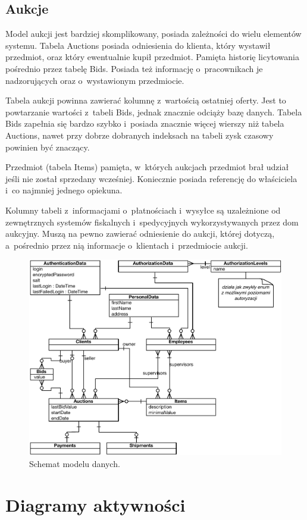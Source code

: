 \documentclass[10pt,a4paper]{article}
\newcommand{\s}[1]{\textsf{#1}}
\begin{document}
\subsection{Aukcje}

Model aukcji jest bardziej skomplikowany, posiada zależności do wielu elementów
systemu. Tabela \s{Auctions} posiada odniesienia do klienta, który wystawił
przedmiot, oraz który ewentualnie kupił przedmiot. Pamięta historię licytowania
pośrednio przez tabelę \s{Bids}. Posiada też informację o~pracownikach je
nadzorujących oraz o~wystawionym przedmiocie.

Tabela aukcji powinna zawierać kolumnę z~wartością ostatniej oferty. Jest to
powtarzanie wartości z~tabeli \s{Bids}, jednak znacznie odciąży bazę danych.
Tabela \s{Bids} zapełnia się bardzo szybko i~posiada znacznie więcej wierszy
niż tabela \s{Auctions}, nawet przy dobrze dobranych indeksach na tabeli zysk
czasowy powinien być znaczący.

Przedmiot (tabela \s{Items}) pamięta, w~których aukcjach przedmiot brał udział
jeśli nie został sprzedany wcześniej. Koniecznie posiada referencję do
właściciela i~co najmniej jednego opiekuna.

Kolumny tabeli z~informacjami o~płatnościach i~wysyłce są uzależnione od
zewnętrznych systemów fiskalnych i~spedycyjnych wykorzystywanych przez dom
aukcyjny. Muszą na pewno zawierać odniesienie do aukcji, której dotyczą,
a~pośrednio przez nią informacje o~klientach i~przedmiocie aukcji.

\begin{figure}[p]
  \begin{adjustwidth}{-2cm}{-2cm}
    \centering
    \includegraphics{figury/model-danych}
    \caption{Schemat modelu danych.}
    \label{fig:model_danych}
  \end{adjustwidth}
\end{figure}

\section{Diagramy aktywności}
\end{document}
